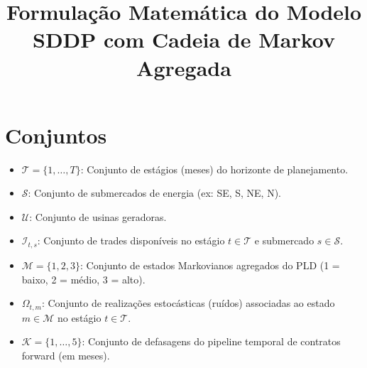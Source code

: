 \documentclass{article}
\begin{document}
\title{Formulação Matemática do Modelo SDDP com Cadeia de Markov Agregada}
\author{}
\date{}
\maketitle

\section{Conjuntos}
\begin{itemize}

    \item $\mathcal{T} = \{1, \ldots, T\}$: Conjunto de estágios (meses) do horizonte de planejamento.

    \item $\mathcal{S}$: Conjunto de submercados de energia (ex: SE, S, NE, N).

    \item $\mathcal{U}$: Conjunto de usinas geradoras.

    \item $\mathcal{I}_{t,s}$: Conjunto de trades disponíveis no estágio $t \in \mathcal{T}$
    e submercado $s \in \mathcal{S}$.

    \item $\mathcal{M} = \{1, 2, 3\}$: Conjunto de estados Markovianos agregados do PLD
    (1 = baixo, 2 = médio, 3 = alto).

    \item $\Omega_{t,m}$: Conjunto de realizações estocásticas (ruídos) associadas ao estado
    $m \in \mathcal{M}$ no estágio $t \in \mathcal{T}$.

    \item $\mathcal{K} = \{1, \ldots, 5\}$: Conjunto de defasagens do pipeline temporal
    de contratos forward (em meses).

\end{itemize}
\end{document}
